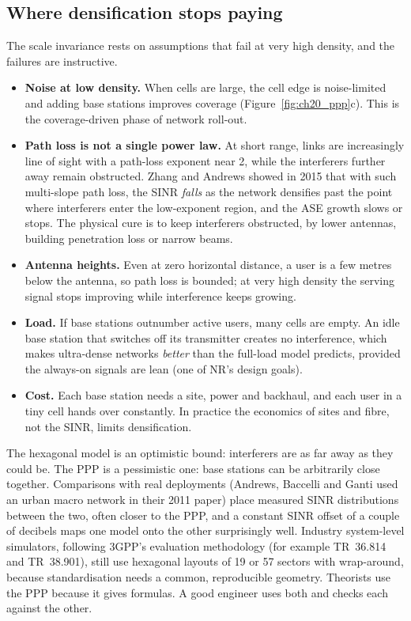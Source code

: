 \subsection{Where densification stops paying}

The scale invariance rests on assumptions that fail at very high density, and the failures are instructive.
\begin{itemize}
\item \textbf{Noise at low density.} When cells are large, the cell edge is noise-limited and adding base stations
improves coverage (Figure~\ref{fig:ch20_ppp}c). This is the coverage-driven phase of network roll-out.
\item \textbf{Path loss is not a single power law.} At short range, links are increasingly line of sight with a
path-loss exponent near 2, while the interferers further away remain obstructed. Zhang and Andrews showed in 2015 that
with such multi-slope path loss, the SINR \emph{falls} as the network densifies past the point where interferers enter
the low-exponent region, and the ASE growth slows or stops. The physical cure is to keep interferers obstructed, by
lower antennas, building penetration loss or narrow beams.
\item \textbf{Antenna heights.} Even at zero horizontal distance, a user is a few metres below the antenna, so path
loss is bounded; at very high density the serving signal stops improving while interference keeps growing.
\item \textbf{Load.} If base stations outnumber active users, many cells are empty. An idle base station that switches
off its transmitter creates no interference, which makes ultra-dense networks \emph{better} than the full-load model
predicts, provided the always-on signals are lean (one of NR's design goals).
\item \textbf{Cost.} Each base station needs a site, power and backhaul, and each user in a tiny cell hands over
constantly. In practice the economics of sites and fibre, not the SINR, limits densification.
\end{itemize}

\begin{inpractice}
The hexagonal model is an optimistic bound: interferers are as far away as they could be. The PPP is a pessimistic
one: base stations can be arbitrarily close together. Comparisons with real deployments (Andrews, Baccelli and Ganti
used an urban macro network in their 2011 paper) place measured SINR distributions between the two, often closer to
the PPP, and a constant SINR offset of a couple of decibels maps one model onto the other surprisingly well. Industry
system-level simulators, following 3GPP's evaluation methodology (for example TR~36.814 and TR~38.901), still use
hexagonal layouts of 19 or 57 sectors with wrap-around, because standardisation needs a common, reproducible
geometry. Theorists use the PPP because it gives formulas. A good engineer uses both and checks each against the
other.
\end{inpractice}

